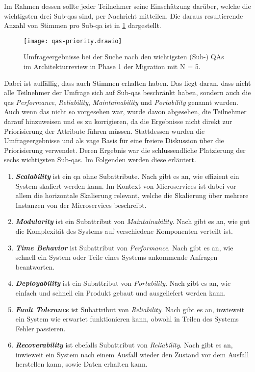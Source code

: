 Im Rahmen dessen sollte jeder Teilnehmer seine Einschätzung darüber, welche die wichtigsten drei Sub-\glspl{qa} sind, per Nachricht mitteilen.
Die daraus resultierende Anzahl von Stimmen pro Sub-\gls{qa} ist in \cref{fig:qas-priority} dargestellt. 
% 
\begin{figure}
	\centering
	\texttt{[image: qas-priority.drawio]}
	\caption[Umfrageergebnisse wichtigste (Sub-) QAs im Architekturreview]{
		Umfrageergebnisse bei der Suche nach den wichtigsten (Sub-) QAs im Architekturreview in Phase 1 der Migration mit N = 5.
	}
	\label{fig:qas-priority}
\end{figure}
Dabei ist auffällig, dass auch   Stimmen erhalten haben.
Das liegt daran, dass nicht alle Teilnehmer der Umfrage sich auf Sub-\glspl{qa} beschränkt haben, sondern auch die \glspl{qa} \emph{Performance}, \emph{Reliability}, \emph{Maintainability} und \emph{Portability} genannt wurden.
Auch wenn das nicht so vorgesehen war, wurde davon abgesehen, die Teilnehmer darauf hinzuweisen und es zu korrigieren, da die Ergebnisse nicht direkt zur Priorisierung der Attribute führen müssen.
Stattdessen wurden die Umfrageergebnisse und als vage Basis für eine freiere Diskussion über die Priorisierung verwendet. 
Deren Ergebnis war die schlussendliche Platzierung der sechs wichtigsten Sub-\glspl{qa}.
Im Folgenden werden diese erläutert.
\begin{enumerate}
	\item \textbf{\emph{Scalability}} ist ein \gls{qa} ohne Subattribute. Nach  gibt es an, wie effizient ein System skaliert werden kann. Im Kontext von Microservices ist dabei vor allem die horizontale Skalierung relevant, welche die Skalierung über mehrere Instanzen von der Microservices beschreibt.
	\item \textbf{\emph{Modularity}} ist ein Subattribut von \emph{Maintainability}. Nach  gibt es an, wie gut die Komplexität des Systems auf verschiedene Komponenten verteilt ist.
	\item \textbf{\emph{Time Behavior}} ist Subattribut von \emph{Performance}. Nach  gibt es an, wie schnell ein System oder Teile eines Systems ankommende Anfragen beantworten.
	\item \textbf{\emph{Deployability}} ist ein Subattribut von \emph{Portability}. Nach  gibt es an, wie einfach und schnell ein Produkt gebaut und ausgeliefert werden kann.
	\item \textbf{\emph{Fault Tolerance}} ist Subattribut von \emph{Reliability}. Nach  gibt es an, inwieweit ein System wie erwartet funktionieren kann, obwohl in Teilen des Systems Fehler passieren.
	\item \textbf{\emph{Recoverability}} ist ebefalls Subattribut von \emph{Reliability}. Nach  gibt es an, inwieweit ein System nach einem Ausfall wieder den Zustand vor dem Ausfall herstellen kann, sowie Daten erhalten kann.
\end{enumerate}
